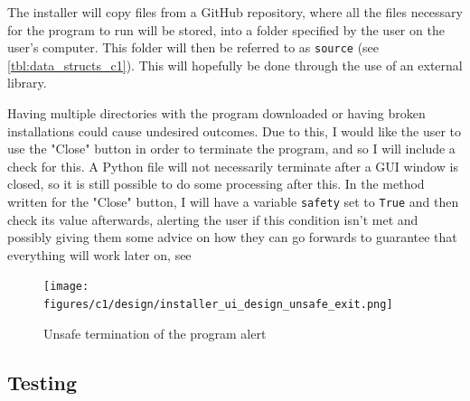 \documentclass[11pt]{article}
\begin{document}
                The installer will copy files from a GitHub repository, where all the files necessary for the program to run will be stored, into a folder specified by the user on the user's computer. This folder will then be referred to as \verb|source| (see \autoref{tbl:data_structs_c1}). This will hopefully be done through the use of an external library.

                Having multiple directories with the program downloaded or having broken installations could cause undesired outcomes. Due to this, I would like the user to use the "Close" button in order to terminate the program, and so I will include a check for this. A Python file will not necessarily terminate after a GUI window is closed, so it is still possible to do some processing after this. In the method written for the "Close" button, I will have a variable \verb|safety| set to \verb|True| and then check its value afterwards, alerting the user if this condition isn't met and possibly giving them some advice on how they can go forwards to guarantee that everything will work later on, see 

                \begin{figure}[!ht]
                    \centering
                    \texttt{[image: figures/c1/design/installer\_ui\_design\_unsafe\_exit.png]}
                    \caption{Unsafe termination of the program alert}
                    \label{fig:installer_ui_design_unsafe_exit_c1}
                \end{figure}

        \subsection{Testing}
\end{document}

